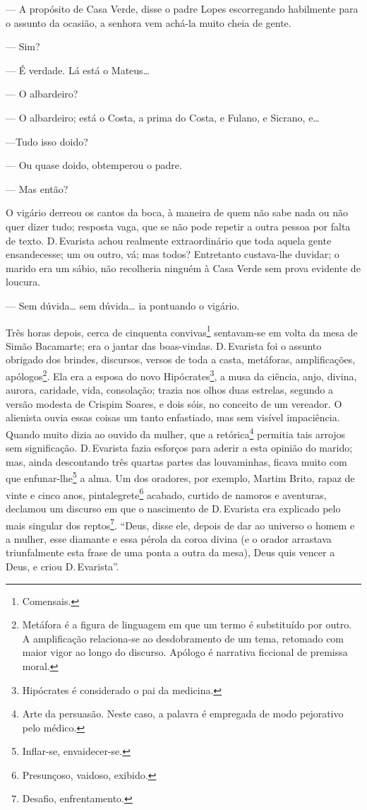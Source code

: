 --- A propósito de Casa Verde, disse o padre Lopes escorregando
habilmente para o assunto da ocasião, a senhora vem achá-la muito cheia
de gente.

--- Sim?

--- É verdade. Lá está o Mateus\ldots{}

--- O albardeiro?

--- O albardeiro; está o Costa, a prima do Costa, e Fulano, e Sicrano,
e\ldots{}

---Tudo isso doido?

--- Ou quase doido, obtemperou o padre.

--- Mas então?

O vigário derreou os cantos da boca, à maneira de quem não sabe nada ou
não quer dizer tudo; resposta vaga, que se não pode repetir a outra
pessoa por falta de texto. D.\,Evarista achou realmente extraordinário
que toda aquela gente ensandecesse; um ou outro, vá; mas todos?
Entretanto custava-lhe duvidar; o marido era um sábio, não recolheria
ninguém à Casa Verde sem prova evidente de loucura.

--- Sem dúvida\ldots{} sem dúvida\ldots{} ia pontuando o vigário.

Três horas depois, cerca de cinquenta convivas\footnote{Comensais.}
sentavam-se em volta da mesa de Simão Bacamarte; era o jantar das
boas-vindas. D.\,Evarista foi o assunto obrigado dos brindes, discursos,
versos de toda a casta, metáforas, amplificações, apólogos\footnote{Metáfora
  é a figura de linguagem em que um termo é substituído por outro. A
  amplificação relaciona-se ao desdobramento de um tema, retomado com
  maior vigor ao longo do discurso. Apólogo é narrativa ficcional de
  premissa moral.}. Ela era a esposa do novo Hipócrates\footnote{Hipócrates
  é considerado o pai da medicina.}, a musa da ciência, anjo, divina,
aurora, caridade, vida, consolação; trazia nos olhos duas estrelas,
segundo a versão modesta de Crispim Soares, e dois sóis, no conceito de
um vereador. O alienista ouvia essas coisas um tanto enfastiado, mas sem
visível impaciência. Quando muito dizia ao ouvido da mulher, que a
retórica\footnote{Arte da persuasão. Neste caso, a palavra é empregada
  de modo pejorativo pelo médico.} permitia tais arrojos sem
significação. D.\,Evarista fazia esforços para aderir a esta opinião do
marido; mas, ainda descontando três quartas partes das louvaminhas,
ficava muito com que enfunar-lhe\footnote{Inflar-se, envaidecer-se.} a
alma. Um dos oradores, por exemplo, Martim Brito, rapaz de vinte e cinco
anos, pintalegrete\footnote{Presunçoso, vaidoso, exibido.} acabado,
curtido de namoros e aventuras, declamou um discurso em que o nascimento
de D.\,Evarista era explicado pelo mais singular dos reptos\footnote{Desafio,
  enfrentamento.}. ``Deus, disse ele, depois de dar ao universo o homem
e a mulher, esse diamante e essa pérola da coroa divina (e o orador
arrastava triunfalmente esta frase de uma ponta a outra da mesa), Deus
quis vencer a Deus, e criou D.\,Evarista''.

